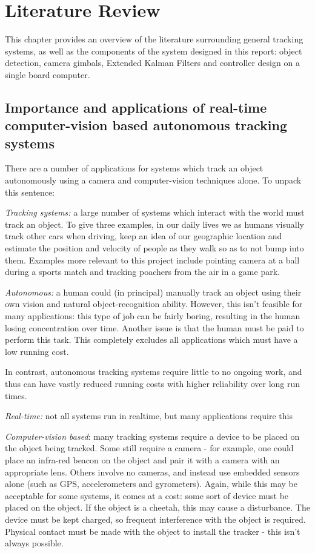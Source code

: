 \chapter{Literature Review}

This chapter provides an overview of the literature surrounding general tracking systems, as well as the components of the system designed in this report: object detection, camera gimbals, Extended Kalman Filters and controller design on a single board computer.

\section{Importance and applications of real-time computer-vision based autonomous tracking systems}
There are a number of applications for systems which track an object autonomously using a camera and computer-vision techniques alone. To unpack this sentence:

\textit{Tracking systems:} a large number of systems which interact with the world must track an object. To give three examples, in our daily lives we as humans visually track other cars when driving, keep an idea of our geographic location and estimate the position and velocity of people as they walk so as to not bump into them. Examples more relevant to this project include pointing camera at a ball during a sports match and tracking poachers from the air in a game park.

\textit{Autonomous:} a human could (in principal) manually track an object using their own vision and natural object-recognition ability. However, this isn't feasible for many applications: this type of job can be fairly boring, resulting in the human losing concentration over time. Another issue is that the human must be paid to perform this task. This completely excludes all applications which must have a low running cost.

In contrast, autonomous tracking systems require little to no ongoing work, and thus can have vastly reduced running costs with higher reliability over long run times.

\textit{Real-time:} {\Large \color{red} not all systems run in realtime, but many applications require this}

\textit{Computer-vision based}: many tracking systems require a device to be placed on the object being tracked. Some still require a camera - for example, one could place an infra-red beacon on the object and pair it with a camera with an appropriate lens. Others involve no cameras, and instead use embedded sensors alone (such as GPS, accelerometers and gyrometers). Again, while this may be acceptable for some systems, it comes at a cost: some sort of device must be placed on the object. If the object is a cheetah, this may cause a disturbance. The device must be kept charged, so frequent interference with the object is required. Physical contact must be made with the object to install the tracker - this isn't always possible.

